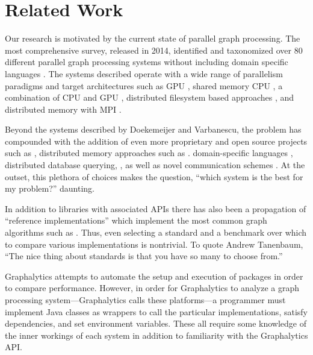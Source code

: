 \documentclass{llncs}
\begin{document}
\section{Related Work}

Our research is motivated by the current state of parallel graph processing. The most comprehensive survey, released in 2014, identified and taxonomized over 80 different parallel graph processing systems without including domain specific languages \cite{Doekemeijer:2015:GPFSurvey}. The systems described operate with a wide range of parallelism paradigms and target architectures such as GPU \cite{Zhong:2014:Medusa, Kang:2009:Pegasus}, shared memory CPU \cite{Shun:2013:Ligra, kyrola:2012:Graphchi, Nguyen:2013:Galois}, a combination of CPU and GPU \cite{Gharaibeh:2012:Totem}, distributed filesystem based approaches \cite{Xin:2013:GraphX}, and distributed memory with MPI \cite{Gregor:2005:PBGL}.

Beyond the systems described by Doekemeijer and Varbanescu, the problem has compounded with the addition of even more proprietary and open source projects such as \cite{Cheramangalath:2015:Falcon,Perez:2015:Ringo}, distributed memory approaches such as \cite{Hong:2015:PGX}. domain-specific languages \cite{Hong:2012:GreenMarl}, distributed database querying, \cite{Rodriguez:2015:Gremlin}, as well as novel communication schemes \cite{Edmonds:2013:ActiveMessages}. At the outset, this plethora of choices makes the question, ``which system is the best for my problem?'' daunting.

In addition to libraries with associated APIs there has also been a propagation of ``reference implementations'' which implement the most common graph algorithms such as \cite{Beamer:2015:GAPBench, Nai:2015:Graphbig}. Thus, even selecting a standard and a benchmark over which to compare various implementations is nontrivial. To quote Andrew Tanenbaum, ``The nice thing about standards is that you have so many to choose from.''


Graphalytics \cite{Capota:2015:Graphalytics} attempts to automate the setup and execution of packages in order to compare performance. However, in order for Graphalytics to analyze a graph processing system---Graphalytics calls these platforms---a programmer must implement Java classes as wrappers to call the particular implementations, satisfy dependencies, and set environment variables. These all require some knowledge of the inner workings of each system in addition to familiarity with the Graphalytics API.
\end{document}
